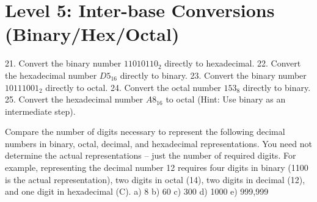 \documentclass[11pt,a4paper,twoside]{article}
\begin{document}
\section{Level 5: Inter-base Conversions (Binary/Hex/Octal)}

21. Convert the binary number $11010110_2$ directly to hexadecimal.
22. Convert the hexadecimal number $D5_{16}$ directly to binary.
23. Convert the binary number $10111001_2$ directly to octal.
24. Convert the octal number $153_8$ directly to binary.
25. Convert the hexadecimal number $A8_{16}$ to octal (Hint: Use binary as an intermediate step).

Compare the number of digits necessary to represent the following decimal numbers in
binary, octal, decimal, and hexadecimal representations. You need not determine the
actual representations -- just the number of required digits. For example, representing
the decimal number 12 requires four digits in binary (1100 is the actual representation),
two digits in octal (14), two digits in decimal (12), and one digit in hexadecimal (C).
a) 8
b) 60
c) 300
d) 1000
e) 999,999
\end{document}
